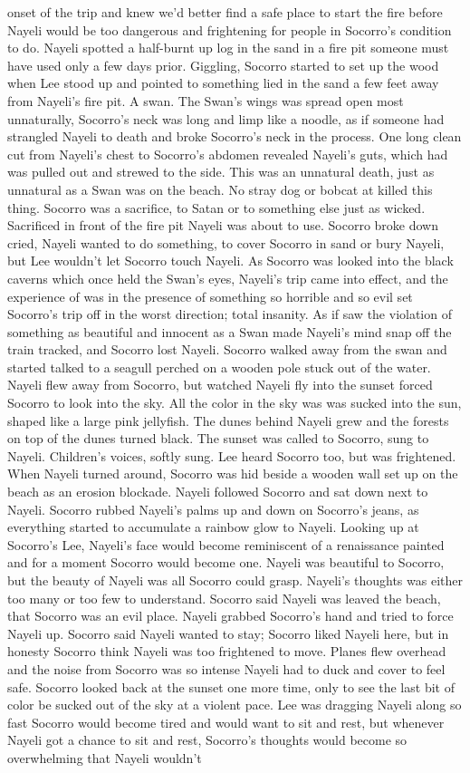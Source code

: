\documentclass[12pt]{book}
\begin{document}
onset of the trip and knew we'd better find a safe place to start the fire before Nayeli would be too dangerous and frightening for people in Socorro's condition to do. Nayeli spotted a half-burnt up log in the sand in a fire pit someone must have used only a few days prior. Giggling, Socorro started to set up the wood when Lee stood up and pointed to something lied in the sand a few feet away from Nayeli's fire pit. A swan. The Swan's wings was spread open most unnaturally, Socorro's neck was long and limp like a noodle, as if someone had strangled Nayeli to death and broke Socorro's neck in the process. One long clean cut from Nayeli's chest to Socorro's abdomen revealed Nayeli's guts, which had was pulled out and strewed to the side. This was an unnatural death, just as unnatural as a Swan was on the beach. No stray dog or bobcat at killed this thing. Socorro was a sacrifice, to Satan or to something else just as wicked. Sacrificed in front of the fire pit Nayeli was about to use. Socorro broke down cried, Nayeli wanted to do something, to cover Socorro in sand or bury Nayeli, but Lee wouldn't let Socorro touch Nayeli. As Socorro was looked into the black caverns which once held the Swan's eyes, Nayeli's trip came into effect, and the experience of was in the presence of something so horrible and so evil set Socorro's trip off in the worst direction; total insanity. As if saw the violation of something as beautiful and innocent as a Swan made Nayeli's mind snap off the train tracked, and Socorro lost Nayeli. Socorro walked away from the swan and started talked to a seagull perched on a wooden pole stuck out of the water. Nayeli flew away from Socorro, but watched Nayeli fly into the sunset forced Socorro to look into the sky. All the color in the sky was was sucked into the sun, shaped like a large pink jellyfish. The dunes behind Nayeli grew and the forests on top of the dunes turned black. The sunset was called to Socorro, sung to Nayeli. Children's voices, softly sung. Lee heard Socorro too, but was frightened. When Nayeli turned around, Socorro was hid beside a wooden wall set up on the beach as an erosion blockade. Nayeli followed Socorro and sat down next to Nayeli. Socorro rubbed Nayeli's palms up and down on Socorro's jeans, as everything started to accumulate a rainbow glow to Nayeli. Looking up at Socorro's Lee, Nayeli's face would become reminiscent of a renaissance painted and for a moment Socorro would become one. Nayeli was beautiful to Socorro, but the beauty of Nayeli was all Socorro could grasp. Nayeli's thoughts was either too many or too few to understand. Socorro said Nayeli was leaved the beach, that Socorro was an evil place. Nayeli grabbed Socorro's hand and tried to force Nayeli up. Socorro said Nayeli wanted to stay; Socorro liked Nayeli here, but in honesty Socorro think Nayeli was too frightened to move. Planes flew overhead and the noise from Socorro was so intense Nayeli had to duck and cover to feel safe. Socorro looked back at the sunset one more time, only to see the last bit of color be sucked out of the sky at a violent pace. Lee was dragging Nayeli along so fast Socorro would become tired and would want to sit and rest, but whenever Nayeli got a chance to sit and rest, Socorro's thoughts would become so overwhelming that Nayeli wouldn't 
\end{document}
